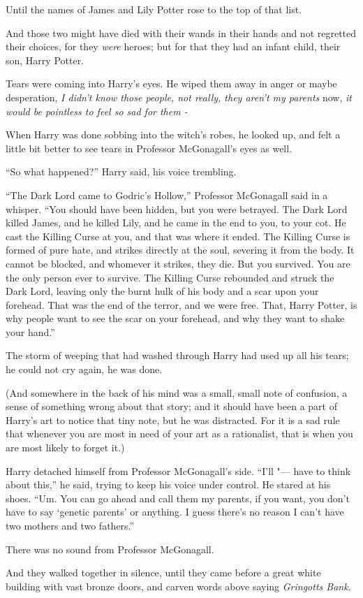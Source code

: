 Until the names of James and Lily Potter rose to the top of that list.

And those two might have died with their wands in their hands and not
regretted their choices, for they \emph{were} heroes; but for that they
had an infant child, their son, Harry Potter.

Tears were coming into Harry's eyes. He wiped them away in anger or
maybe desperation, \emph{I didn't know those people, not really, they
aren't my parents} now, \emph{it would be pointless to feel so sad for
them -}

When Harry was done sobbing into the witch's robes, he looked up, and
felt a little bit better to see tears in Professor McGonagall's eyes as
well.

``So what happened?'' Harry said, his voice trembling.

``The Dark Lord came to Godric's Hollow,'' Professor McGonagall said in
a whisper. ``You should have been hidden, but you were betrayed. The
Dark Lord killed James, and he killed Lily, and he came in the end to
you, to your cot. He cast the Killing Curse at you, and that was where
it ended. The Killing Curse is formed of pure hate, and strikes directly
at the soul, severing it from the body. It cannot be blocked, and
whomever it strikes, they die. But you survived. You are the only person
ever to survive. The Killing Curse rebounded and struck the Dark Lord,
leaving only the burnt hulk of his body and a scar upon your forehead.
That was the end of the terror, and we were free. That, Harry Potter, is
why people want to see the scar on your forehead, and why they want to
shake your hand.''

The storm of weeping that had washed through Harry had used up all his
tears; he could not cry again, he was done.

(And somewhere in the back of his mind was a small, small note of
confusion, a sense of something wrong about that story; and it should
have been a part of Harry's art to notice that tiny note, but he was
distracted. For it is a sad rule that whenever you are most in need of
your art as a rationalist, that is when you are most likely to forget
it.)

Harry detached himself from Professor McGonagall's side. ``I'll "--- have
to think about this,'' he said, trying to keep his voice under control.
He stared at his shoes. ``Um. You can go ahead and call them my parents,
if you want, you don't have to say `genetic parents' or anything. I
guess there's no reason I can't have two mothers and two fathers.''

There was no sound from Professor McGonagall.

And they walked together in silence, until they came before a great
white building with vast bronze doors, and carven words above saying
\emph{Gringotts Bank.}
